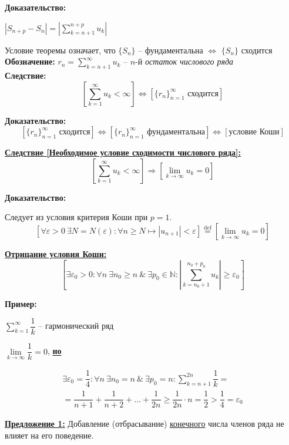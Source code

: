\documentclass[a4paper,12pt]{article} %
\newcommand{\eqdef}{\stackrel{\mathrm{def}}{=}}
\newcommand{\N}{\mathbb{N}}
\newcommand{\useriesl}{\sum\limits_{k=1}^{\infty} u_k < \infty}
\begin{document}
\textbf{Доказательство:}

$|S_{n+p} - S_n| = \left|\sum\limits_{k=n+1}^{n+p} u_k \right|$

Условие теоремы означает, что $\{ S_n \}$ -- фундаментальна $\Leftrightarrow$ $\{ S_n \}$ сходится\\

\textbf{Обозначение:}
$r_n = \sum\limits_{k=n+1}^{\infty} u_k$ -- $n$-й \textit{остаток числового ряда}\\

\textbf{Следствие:}
\[ \left[ \useriesl \right] \Leftrightarrow \left[ \{ r_n \}_{n=1}^{\infty} \text{ сходится} \right] \]

\textbf{Доказательство:}
\[ \left[ \{ r_n \}_{n=1}^{\infty} \text{ сходится} \right] \Leftrightarrow \left[ \{ r_n \}_{n=1}^{\infty} \text{ фундаментальна} \right] \Leftrightarrow \left[ \text{условие Коши} \right] \]

\underline{\textbf{Следствие [Необходимое условие сходимости числового ряда]:}}
\[ \left[ \useriesl \right] \Rightarrow \left[ \lim\limits_{k \to \infty} u_k = 0 \right] \]

\textbf{Доказательство:}

Следует из условия критерия Коши при $p = 1$.
\[ \left[ \forall \varepsilon > 0 \ \exists N = N(\varepsilon): \forall n \geqslant N \mapsto |u_{n+1}|<\varepsilon \right] \eqdef \left[ \lim\limits_{k \to \infty}  u_k = 0 \right] \]

\underline{\textbf{Отрицание условия Коши:}}
\[ \left[ \exists \varepsilon_0 > 0: \forall n \ \exists n_0 \geqslant n \ \& \ \exists p_0 \in \N: \left| \sum\limits_{k = n_0 + 1}^{n_0 + p_0} u_k \right| \geqslant \varepsilon_0 \right] \]

\textbf{Пример:}

$\sum\limits_{k=1}^{\infty} \dfrac{1}{k}$ -- гармонический ряд

$\lim\limits_{k \to \infty} \dfrac{1}{k} = 0$, \underline{\textbf{но}}

\begin{multline*}
	\exists \varepsilon_0 = \dfrac{1}{4}: \forall n \ \exists n_0 = n \ \& \ \exists p_0 = n: \sum\limits_{k = n+1}^{2n} \dfrac{1}{k} = \\ = \dfrac{1}{n+1}+ \dfrac{1}{n+2} + \ldots + \dfrac{1}{2n} \geqslant \dfrac{1}{2n} \cdot n = \dfrac{1}{2} > \dfrac{1}{4} = \varepsilon_0
\end{multline*}

\underline{\textbf{Предложение 1:}} Добавление (отбрасывание) \underline{конечного} числа членов ряда не влияет на его поведение.\\
\end{document}
